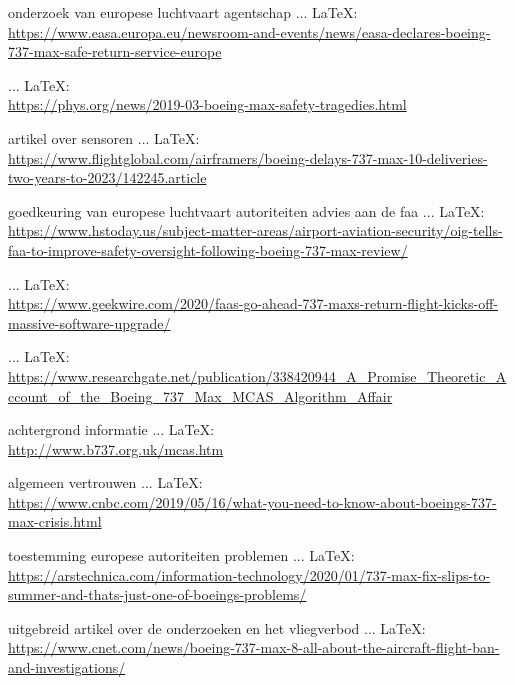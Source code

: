 \begin{thebibliography}{99}
{{{    onderzoek van europese luchtvaart agentschap
     ... \LaTeX:\\ \url{https://www.easa.europa.eu/newsroom-and-events/news/easa-declares-boeing-737-max-safe-return-service-europe}
    
    \veiligheidsvraagstuk
     ... \LaTeX:\\ \url{https://phys.org/news/2019-03-boeing-max-safety-tragedies.html}
    
    artikel over sensoren
     ... \LaTeX:\\ \url{https://www.flightglobal.com/airframers/boeing-delays-737-max-10-deliveries-two-years-to-2023/142245.article}
    
    goedkeuring van europese luchtvaart autoriteiten
    advies aan de faa
     ... \LaTeX:\\ \url{https://www.hstoday.us/subject-matter-areas/airport-aviation-security/oig-tells-faa-to-improve-safety-oversight-following-boeing-737-max-review/}
    
     ... \LaTeX:\\ \url{https://www.geekwire.com/2020/faas-go-ahead-737-maxs-return-flight-kicks-off-massive-software-upgrade/}
    
     ... \LaTeX:\\ \url{https://www.researchgate.net/publication/338420944_A_Promise_Theoretic_Account_of_the_Boeing_737_Max_MCAS_Algorithm_Affair}
    
    achtergrond informatie
     ... \LaTeX:\\ \url{http://www.b737.org.uk/mcas.htm}
    
    algemeen vertrouwen
     ... \LaTeX:\\ \url{https://www.cnbc.com/2019/05/16/what-you-need-to-know-about-boeings-737-max-crisis.html}
    
    toestemming europese autoriteiten
    problemen
     ... \LaTeX:\\ \url{https://arstechnica.com/information-technology/2020/01/737-max-fix-slips-to-summer-and-thats-just-one-of-boeings-problems/}
    
    uitgebreid artikel over de onderzoeken en het vliegverbod
     ... \LaTeX:\\ \url{https://www.cnet.com/news/boeing-737-max-8-all-about-the-aircraft-flight-ban-and-investigations/}
    
}}}
\end{thebibliography}
